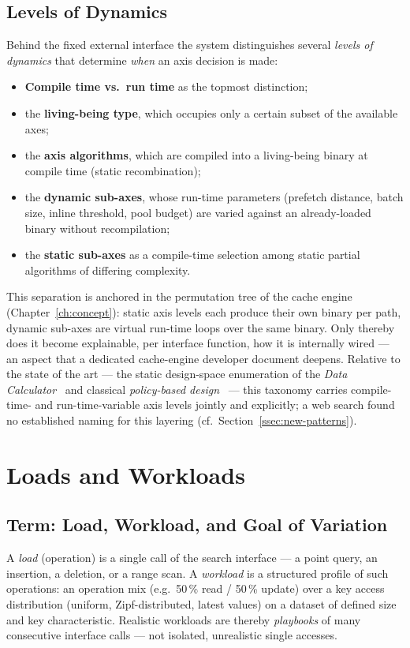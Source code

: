 \subsection{Levels of Dynamics}\label{ssec:dynamics-levels}
Behind the fixed external interface the system distinguishes several \emph{levels of dynamics} that
determine \emph{when} an axis decision is made:
\begin{itemize}
  \item \textbf{Compile time vs.\ run time} as the topmost distinction;
  \item the \textbf{living-being type}, which occupies only a certain subset of the available axes;
  \item the \textbf{axis algorithms}, which are compiled into a living-being binary at compile time
  (static recombination);
  \item the \textbf{dynamic sub-axes}, whose run-time parameters (prefetch distance, batch size,
  inline threshold, pool budget) are varied against an already-loaded binary without recompilation;
  \item the \textbf{static sub-axes} as a compile-time selection among static partial algorithms of
  differing complexity.
\end{itemize}
This separation is anchored in the permutation tree of the cache engine (Chapter~\ref{ch:concept}):
static axis levels each produce their own binary per path, dynamic sub-axes are virtual run-time
loops over the same binary. Only thereby does it become explainable, per interface function, how it
is internally wired --- an aspect that a dedicated cache-engine developer document deepens. Relative
to the state of the art --- the static design-space enumeration of the
\emph{Data Calculator}~\cite{idreos2018datacalculator} and classical
\emph{policy-based design}~\cite{alexandrescu2001modern} --- this taxonomy carries compile-time- and
run-time-variable axis levels jointly and explicitly; a web search found no established naming for
this layering (cf.\ Section~\ref{ssec:new-patterns}).

\section{Loads and Workloads}\label{sec:workloads-basics}
\subsection{Term: Load, Workload, and Goal of Variation}\label{ssec:load-terms}
A \emph{load} (operation) is a single call of the search interface --- a point query, an insertion,
a deletion, or a range scan. A \emph{workload} is a structured profile of such operations: an
operation mix (e.g.\ 50\,\% read / 50\,\% update) over a key access distribution (uniform,
Zipf-distributed, latest values) on a dataset of defined size and key characteristic. Realistic
workloads are thereby \emph{playbooks} of many consecutive interface calls --- not isolated,
unrealistic single accesses.

